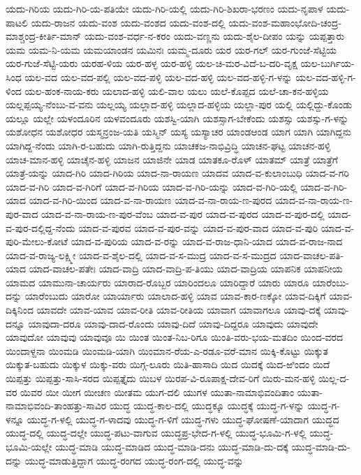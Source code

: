 ಯದು-ಗಿರಿಯ
ಯದು-ಗಿರಿ-ಯ-ಪತಿಯೇ
ಯದು-ಗಿರಿ-ಯಲ್ಲಿ
ಯದು-ಗಿರಿ-ಶಿಖರಾ-ಭರಣಂ
ಯದು-ನೃಪಾಳ
ಯದು-ಪಾಟಲಿ
ಯದು-ರಾಜನ
ಯದು-ವಂಶ
ಯದು-ವಂಶದ
ಯದು-ವಂಶ-ದಲ್ಲಿ
ಯದು-ವಂಶ-ಮಹಾಂಭೋದಿ-ಚಂದ್ರ-ಮಾಶ್ಚಂದ್ರ-ಕೀರ್ತಿ-ಮಾನ್
ಯದು-ವಂಶ-ವರ್ಧ-ನ-ಕರಂ
ಯದು-ವಣ್ಣನು
ಯದು-ಶೈಲ-ದೀಪಂ
ಯನ್ನು
ಯಪ್ಪತ್ತಾರು
ಯಮ
ಯಮ-ನಿ-ಯಮ
ಯಮಯಾಂಡನ
ಯಮಿನಃ
ಯಮ್ಮ-ದೂರು
ಯರ
ಯರ-ಗಲ್
ಯರ-ಗುಂಜೆ-ಸೆಟ್ಟಿಯ
ಯರ-ಗುಜೆ-ಸೆಟ್ಟಿ-ಯರು
ಯರಹ-ಳಿಯ
ಯರ-ಹಳ್ಳ
ಯರ-ಹಳ್ಳಿ
ಯಲ-ಚಿ-ಮರ-ವಿದೆ-ಬ-ದರಿ-ವೃಕ್ಷ
ಯಲ-ಬುರ್ಗಿಯ-ಸಿಂಧ
ಯಲ-ವದ
ಯಲ-ವದ-ಪಲ್ಲಿ
ಯಲ-ವದ-ಪಳ್ಳಿ
ಯಲ-ವದ-ಹಳ್ಳಿ
ಯಲ-ವದ-ಹಳ್ಳಿ-ಗ-ಳನ್ನು
ಯಲ-ವದ-ಹಳ್ಳಿ-ಗ-ಳಿಂದ
ಯಲ-ಹಂಕ-ನಾಯ-ಕರು
ಯಲಾದ-ಹಳ್ಳಿ
ಯಲಿ-ವಾಲ
ಯಲು
ಯಲೆ-ಕೊಪ್ಪದ
ಯಲೆ-ಚಾ-ಕನ-ಹಳ್ಳಿಯ
ಯಲ್ಲಪ್ಪಯ್ಯ-ನೆಂಬು-ವ-ವನು
ಯಲ್ಲಯ್ಯ
ಯಲ್ಲಾದ-ಹಳ್ಳಿ
ಯಲ್ಲಾದ-ಹಳ್ಳಿಯ
ಯಲ್ಲಾ-ಪುರ
ಯಲ್ಲಿ
ಯಲ್ಲಿದ್ದು-ಕೊಂಡು
ಯಲ್ಲೂ
ಯಲ್ಲೇ
ಯಳಂದೂರಿನ
ಯಳವಂದೂರು
ಯಶಸ್ವಿ-ಯಾಗಿ
ಯಶಸ್ಸಾಗ-ಬೇಕೆಂದು
ಯಶಸ್ಸು
ಯಶಸ್ಸು-ಗ-ಳನ್ನು
ಯಶೋಧನ
ಯಶೋಧರ
ಯಸ್ಮನ್ರಂಜ-ಯತಿ
ಯಸ್ಮಿನ್
ಯಸ್ಯ
ಯಸ್ಯಾಚರ
ಯಾಂಡಆಂಡ
ಯಾಗ
ಯಾಗಿ
ಯಾಗಿದ್ದನು
ಯಾಗಿದ್ದ-ನೆಂದು
ಯಾಗಿ-ರ-ಬಹುದು
ಯಾಗಿ-ರುತ್ತಿದ್ದನು
ಯಾಚಕಜ-ನಾಭಿವ್ರಿದ್ಧಿ
ಯಾಚನ-ಘಟ್ಟ
ಯಾಚನ-ಹಳ್ಳಿ
ಯಾಚ-ಮಾನ-ಹಳ್ಳಿ
ಯಾಚೈನ-ಹಳ್ಳಿ
ಯಾಜನ
ಯಾಜಿನೇ
ಯಾಡ
ಯಾತಕೂ-ರೊಳ್
ಯಾತಮ್
ಯಾತ್ರೆ
ಯಾತ್ರೆಗೆ
ಯಾತ್ರೆ-ಯನ್ನು
ಯಾದ-ಗಿರಿ
ಯಾದ-ಗಿರಿಯ
ಯಾದ-ನಾ-ರಾಯಣ
ಯಾದವ
ಯಾದ-ವ-ಕುಲಾಂಬುಧಿ
ಯಾದ-ವ-ಗರಿ
ಯಾದ-ವ-ಗಿರಿ
ಯಾದ-ವ-ಗಿರಿಗೆ
ಯಾದ-ವ-ಗಿರಿಯ
ಯಾದ-ವ-ಗಿರಿ-ಯನ್ನು
ಯಾದ-ವ-ಗಿರಿ-ಯಲ್ಲಿ
ಯಾದ-ವ-ಗಿರಿ-ಯಾದ
ಯಾದ-ವ-ಗಿರಿ-ಯಿಂದ
ಯಾದ-ವ-ನಾ-ರಾಯಣ
ಯಾದ-ವ-ನಾ-ರಾಯ-ಣ-ಪುರದ
ಯಾದ-ವ-ನಾ-ರಾಯ-ಣ-ಪುರ-ವಾದ
ಯಾದ-ವ-ನಾ-ರಾಯ-ಣ-ಪುರ-ವೆಂಬ
ಯಾದ-ವ-ಪುರ
ಯಾದ-ವ-ಪುರದ
ಯಾದ-ವ-ಪುರ-ದಲ್ಲಿ
ಯಾದ-ವ-ಪುರ-ದಲ್ಲಿದ್ದ-ನೆಂದು
ಯಾದ-ವ-ಪುರವ
ಯಾದ-ವ-ಪುರ-ವನ್ನು
ಯಾದ-ವ-ಪುರ-ವಾದ
ಯಾದ-ವ-ಪುರಿ
ಯಾದ-ವ-ಪುರಿ-ಮೇಲು-ಕೋಟೆ
ಯಾದ-ವ-ಪುರಿಯ
ಯಾದ-ವ-ರನ್ನು
ಯಾದ-ವ-ರಾಜ-ಧಾನಿ-ಯಾದ
ಯಾದ-ವ-ರಾಜ-ನಾದ
ಯಾದ-ವ-ರಾಜ್ಯ-ಲಕ್ಷ್ಮೀ
ಯಾದ-ವ-ಶೈಲ-ದಲ್ಲಿ
ಯಾದ-ವ-ಸ-ಮುದ್ರ
ಯಾದ-ವ-ಸ-ಮುದ್ರದ
ಯಾದ-ವಾಚಲ-ಪತಿ-ಯಾದ
ಯಾದ-ವಾಚಲ-ಪತೇಃ
ಯಾದ-ವಾದ್ರಿ
ಯಾದ-ವಾದ್ರಿ-ಪ-ತಿಯು
ಯಾದ-ವಾದ್ರಿಯ
ಯಾಪನಿಕ
ಯಾಪನೀಯ
ಯಾಮದ
ಯಾಮುನಾ-ಚಾರ್ಯರು
ಯಾರಾದ-ರೊಬ್ಬರ
ಯಾರಿಂದಲೂ
ಯಾರಿದ್ದಾರೆ
ಯಾರು
ಯಾರೂ
ಯಾರೆಂಬು-ದನ್ನು
ಯಾರೆಂಬುದು
ಯಾರೋ
ಯಾರ್ಯಾರು
ಯಾಲಾದ-ಹಳ್ಳಿ
ಯಾವ
ಯಾವ-ಕಾರ-ಣಕ್ಕೋ
ಯಾವ-ದಿಕ್ಕಿಗೆ
ಯಾವ-ದಿಕ್ಕಿನಿಂದ
ಯಾವದೇ
ಯಾವ-ಯಾವ
ಯಾವ-ರೀತಿ
ಯಾವ-ರೀತಿಯ
ಯಾವಾಗ
ಯಾವಾಗಲೂ
ಯಾವು-ದಕ್ಕೆ
ಯಾವು-ದನ್ನೂ
ಯಾವುದಾ-ದರೂ
ಯಾವು-ದಾದ-ರೊಂದು
ಯಾವು-ದಿದೆ
ಯಾವು-ದಿದ್ದರೂ
ಯಾವುದು
ಯಾವುದೇ
ಯಾವುದೋ
ಯಾವುವು
ಯಾವುವೂ
ಯಿ
ಯಿಂತ
ಯಿಂತ-ನಿಬ-ರಿಗೂ
ಯಿಂತಿ-ವರು-ಭಯ-ಮತದಿಂ
ಯಿಂದ-ವರದ
ಯಿಂದಾಳ್ದನಾ
ಯಿಂಮಡಿ
ಯಿಂಮಡಿ-ಯಾಗಿ
ಯಿಂಮಾನ-ರೆಯ-ಎ-ರಡೂ-ವರೆ-ಮಾನ
ಯಿಕ್ಕಿ-ಕೊಟ್ಟು
ಯಿಕ್ಕುತ
ಯಿಕ್ಕುತ-ಬಹುದು
ಯಿಕ್ಕುಳ
ಯಿಕ್ಕು-ವರು
ಯಿಗ್ಗ-ಲೂರು
ಯಿತಿ-ಹಾಸಾದಿ
ಯಿದ
ಯಿದಕ್ಕೆ
ಯಿದ-ಱಿಂದಂ
ಯಿದೆ
ಯಿಪ್ಪತ್ತು
ಯಿಪ್ಪತ್ತು-ಸಾಸಿ-ಸರದ
ಯಿಪ್ಪತ್ತೈದು
ಯಿಬಳ
ಯಿರಪ-ವಿ-ರೂಪಾಕ್ಷ-ದೇವ-ರಿಗೆ
ಯಿರು-ಮನ-ಹಳ್ಳಿ
ಯಿಲ್ಲ-ದ-ವರ
ಯಿವರ
ಯೀ
ಯೀಗ
ಯೀಚಣ
ಯೀತಮ
ಯುಗ-ದಲಿ
ಯುಗಳ
ಯುತಾ-ನಾಮಾಭಿವಂದಿತಾಂ
ಯುತಾ-ನಾಮಾಭಿವಂದಿ-ತಾಂಹತ್ತು-ಸಾವಿರ
ಯುದ್ಧ
ಯುದ್ಧ-ಕಾಲ-ದಲ್ಲಿ
ಯುದ್ಧಕ್ಕೂ
ಯುದ್ಧಕ್ಕೆ
ಯುದ್ಧ-ಗ-ಳನ್ನು
ಯುದ್ಧ-ಗ-ಳನ್ನೂ
ಯುದ್ಧ-ಗ-ಳಲ್ಲಿ
ಯುದ್ಧ-ಗ-ಳಾದವು
ಯುದ್ಧ-ಗ-ಳಿಗೆ
ಯುದ್ಧ-ಗಳು
ಯುದ್ಧ-ಘೋಷಣೆ-ಯಾದಾಗ
ಯುದ್ಧದ
ಯುದ್ಧ-ದಲ್ಲಿ
ಯುದ್ಧ-ದಲ್ಲೇ
ಯುದ್ಧ-ಪಟು-ವಾಗುವ
ಯುದ್ಧಪ್ರ-ಭೇದ-ಗ-ಳಲ್ಲಿ
ಯುದ್ಧ-ಭೂಮಿ-ಗ-ಳಲ್ಲಿ
ಯುದ್ಧ-ಭೂಮಿ-ಯಲ್ಲೇ
ಯುದ್ಧ-ಮಾಡಿ
ಯುದ್ಧ-ಮಾಡಿದ
ಯುದ್ಧ-ಮಾಡಿ-ದನು
ಯುದ್ಧ-ಮಾಡಿ-ದು-ದಕ್ಕೆ
ಯುದ್ಧ-ಮಾಡಿ-ದು-ದನ್ನು
ಯುದ್ಧ-ಮಾಡುತ್ತಿದ್ದಾಗ
ಯುದ್ಧ-ರಂಗದ
ಯುದ್ಧ-ರಂಗ-ದಲ್ಲಿ
ಯುದ್ಧ-ವನ್ನು
